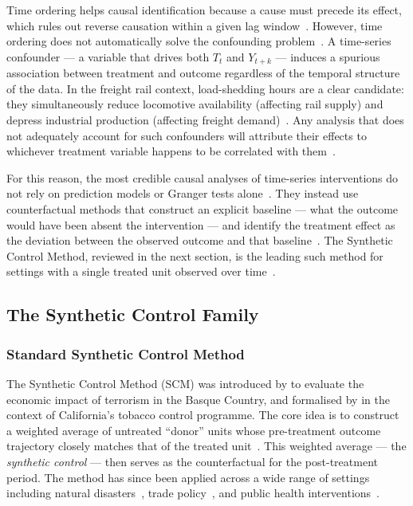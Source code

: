 Time ordering helps causal identification because a cause must
precede its effect, which rules out reverse causation within a given
lag window~\parencite{granger1969, pearl2009}.
However, time ordering does not automatically solve the confounding
problem~\parencite{angrist2009}.
A time-series confounder --- a variable that drives both $T_t$ and
$Y_{t+k}$ --- induces a spurious association between treatment and
outcome regardless of the temporal structure of the data.
In the freight rail context, load-shedding hours are a clear
candidate: they simultaneously reduce locomotive availability
(affecting rail supply) and depress industrial production (affecting
freight demand)~\parencite{havenga2021, transnet2023ar}.
Any analysis that does not adequately account for such confounders
will attribute their effects to whichever treatment variable happens
to be correlated with them~\parencite{pearl2009}.

For this reason, the most credible causal analyses of time-series
interventions do not rely on prediction models or Granger tests
alone~\parencite{abadie2010, benmichael2021}.
They instead use counterfactual methods that construct an explicit
baseline --- what the outcome would have been absent the
intervention --- and identify the treatment effect as the deviation
between the observed outcome and that
baseline~\parencite{rubin1974, abadie2003}.
The Synthetic Control Method, reviewed in the next section, is the
leading such method for settings with a single treated unit observed
over time~\parencite{abadie2010}.

\subsection{The Synthetic Control Family}
\label{sec:scm_family}

\subsubsection{Standard Synthetic Control Method}
\label{sec:base_scm}

The Synthetic Control Method (SCM) was introduced by
\textcite{abadie2003} to evaluate the economic
impact of terrorism in the Basque Country, and formalised by
\textcite{abadie2010} in the context
of California's tobacco control programme.
The core idea is to construct a weighted average of untreated
``donor'' units whose pre-treatment outcome trajectory closely
matches that of the treated unit~\parencite{abadie2010}.
This weighted average --- the \emph{synthetic control} --- then
serves as the counterfactual for the post-treatment period.
The method has since been applied across a wide range of settings
including natural disasters~\parencite{cavallo2013}, trade
policy~\parencite{abadie2015}, and public health
interventions~\parencite{abadie2010}.

